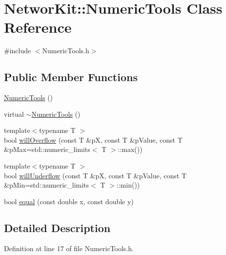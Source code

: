 \hypertarget{class_networ_kit_1_1_numeric_tools}{\section{Networ\-Kit\-:\-:Numeric\-Tools Class Reference}
\label{class_networ_kit_1_1_numeric_tools}
}


{\ttfamily \#include $<$Numeric\-Tools.\-h$>$}

\subsection*{Public Member Functions}
\begin{DoxyCompactItemize}
\item 
\hyperlink{class_networ_kit_1_1_numeric_tools_a4a4bbc3378d259e08ec3d12fb7661ce1}{Numeric\-Tools} ()
\item 
virtual \hyperlink{class_networ_kit_1_1_numeric_tools_abf49306c5fc8b8d1b7aaeba46296d6e0}{$\sim$\-Numeric\-Tools} ()
\item 
{\footnotesize template$<$typename T $>$ }\\bool \hyperlink{class_networ_kit_1_1_numeric_tools_af1e2ca4be6dba3013c37aaaf025f21bc}{will\-Overflow} (const T \&p\-X, const T \&p\-Value, const T \&p\-Max=std\-::numeric\-\_\-limits$<$ T $>$\-::max())
\item 
{\footnotesize template$<$typename T $>$ }\\bool \hyperlink{class_networ_kit_1_1_numeric_tools_a869861d3bce5f6e746bf590016170215}{will\-Underflow} (const T \&p\-X, const T \&p\-Value, const T \&p\-Min=std\-::numeric\-\_\-limits$<$ T $>$\-::min())
\item 
bool \hyperlink{class_networ_kit_1_1_numeric_tools_acadca311d86aa7ba823c749a972598f6}{equal} (const double x, const double y)
\end{DoxyCompactItemize}


\subsection{Detailed Description}


Definition at line 17 of file Numeric\-Tools.\-h.



